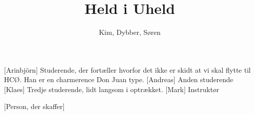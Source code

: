 \documentclass[a4paper,11pt]{article}
\title{Held i Uheld}
\author{Kim, Dybber, Søren}
\begin{document}
\maketitle

\begin{roles}
[Arinbjörn] Studerende, der fortæller hvorfor det ikke er skidt at vi skal flytte til HCØ. Han er en charmerence Don Juan type.
[Andreas] Anden studerende
[Klaes] Tredje studerende, lidt langsom i optrækket.
[Mark] Instruktør
\end{roles}

\begin{props}
[Person, der skaffer]
\end{props}
\end{document}
